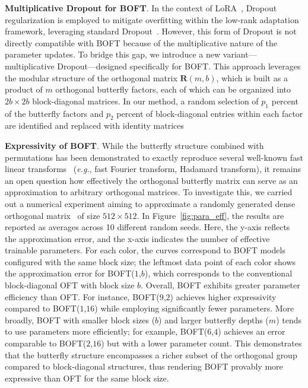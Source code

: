 \textbf{Multiplicative Dropout for BOFT}. In the context of LoRA~\cite{hulora2022}, Dropout regularization is employed to mitigate overfitting within the low-rank adaptation framework, leveraging standard Dropout~\cite{srivastava2014dropout}. However, this form of Dropout is not directly compatible with BOFT because of the multiplicative nature of the parameter updates. To bridge this gap, we introduce a new variant—multiplicative Dropout—designed specifically for BOFT. This approach leverages the modular structure of the orthogonal matrix $\bm{R}(m,b)$, which is built as a product of $m$ orthogonal butterfly factors, each of which can be organized into $2b\times 2b$ block-diagonal matrices. In our method, a random selection of $p_1$ percent of the butterfly factors and $p_2$ percent of block-diagonal entries within each factor are identified and replaced with identity matrices

\textbf{Expressivity of BOFT}. While the butterfly structure combined with permutations has been demonstrated to exactly reproduce several well-known fast linear transforms~\cite{dao2019learning,dao2019kaleidoscope} (\emph{e.g.}, fast Fourier transform, Hadamard transform), it remains an open question how effectively the orthogonal butterfly matrix can serve as an approximation to arbitrary orthogonal matrices. To investigate this, we carried out a numerical experiment aiming to approximate a randomly generated dense orthogonal matrix~\cite{anderson1987generation} of size $512\times 512$. In Figure~\ref{fig:para_eff}, the results are reported as averages across 10 different random seeds. Here, the y-axis reflects the approximation error, and the x-axis indicates the number of effective trainable parameters. For each color, the curves correspond to BOFT models configured with the same block size; the leftmost data point of each color shows the approximation error for BOFT($1$,$b$), which corresponds to the conventional block-diagonal OFT with block size $b$. Overall, BOFT exhibits greater parameter efficiency than OFT. For instance, BOFT($9$,$2$) achieves higher expressivity compared to BOFT($1$,$16$) while employing significantly fewer parameters. More broadly, BOFT with smaller block sizes ($b$) and larger butterfly depths ($m$) tends to use parameters more efficiently; for example, BOFT($6$,$4$) achieves an error comparable to BOFT($2$,$16$) but with a lower parameter count. This demonstrates that the butterfly structure encompasses a richer subset of the orthogonal group compared to block-diagonal structures, thus rendering BOFT provably more expressive than OFT for the same block size.


